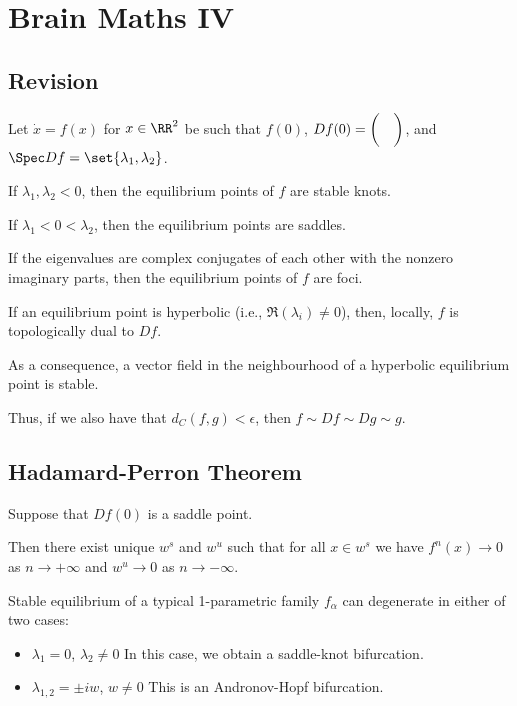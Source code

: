\documentclass[11pt]{scrartcl}
\begin{document}
\section{Brain Maths IV}

\subsection{Revision}

Let $\dot{x} = f(x)$ for $x\in \RR^{2}$ be such that $f(0)$,
$Df(0) = \begin{pmatrix}
  \* & \*\\
  \* & \*
\end{pmatrix}$, and $\Spec Df = \set{\lambda_{1}, \lambda_{2}}$.

If $\lambda_{1}, \lambda_{2} < 0$, then the equilibrium points of $f$
are stable knots.

If $\lambda_{1} < 0 < \lambda_{2}$, then the equilibrium points are
saddles.

If the eigenvalues are complex conjugates of each other with the
nonzero imaginary parts, then the equilibrium points of $f$ are foci.

\begin{theorem}

  If an equilibrium point is hyperbolic (i.e., $\Re (\lambda_{i}) \neq 0$),
  then, locally, $f$ is topologically dual to $Df$.

\end{theorem}

As a consequence, a vector field in the neighbourhood of a hyperbolic
equilibrium point is stable.

Thus, if we also have that $d_{C}(f, g) < \epsilon$, then
$f \sim Df \sim Dg \sim g$.

\subsection{Hadamard-Perron Theorem}

\begin{theorem}
  Suppose that $Df(0)$ is a saddle point.

  Then there exist unique $w^{s}$ and $w^{u}$ such that for all
  $x\in w^{s}$ we have $f^{n}(x) \to 0$ as $n\to +\infty$ and
  $w^{u}\to 0$ as $n\to -\infty$.

\end{theorem}

\begin{theorem}
  Stable equilibrium of a typical 1-parametric family $f_{\alpha}$ can
  degenerate in either of two cases:

  \begin{itemize}
  \item $\lambda_{1} = 0$, $\lambda_{2} \neq 0$
    In this case, we obtain a saddle-knot bifurcation.
  \item $\lambda_{1, 2} = \pm iw$, $w \neq 0$
    This is an Andronov-Hopf bifurcation.
  \end{itemize}
\end{theorem}
\end{document}
